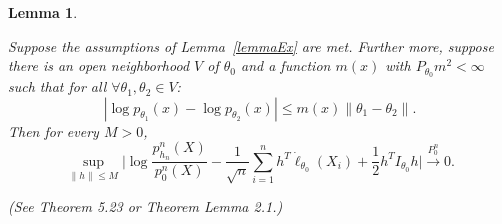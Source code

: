 \documentclass[review]{elsarticle}
\newtheorem{lemma}{Lemma}
\begin{document}
\begin{lemma}\label{lemmaUniform}

    Suppose the assumptions of Lemma~\ref{lemmaEx} are met. Further more, suppose there is an open neighborhood $V$ of $\theta_0$ and a function $m(x)$ with $P_{\theta_0}m^2<\infty$ such that for all $\forall \theta_1,\theta_2\in V$:
    \begin{equation}
        |\log p_{\theta_1}(x)-\log p_{\theta_2}(x)|\leq m(x)\|\theta_1-\theta_2\|.
    \end{equation}
Then for every $M>0$,
    \begin{equation}
        \sup_{\|h\|\leq M}\Big|
         \log \frac{p^n_{h_n}(X)}{p^n_0(X)}-\frac{1}{\sqrt{n}}\sum^n_{i=1}h^T\dot{\ell}_{\theta_0}(X_i)+\frac{1}{2}h^TI_{\theta_0}h
        \Big|\xrightarrow{P^n_0}0.
    \end{equation}

    (See \cite{van2000asymptotic} Theorem 5.23 or \cite{Kleijn2012The} Theorem Lemma 2.1.)
\end{lemma}


\end{document}

